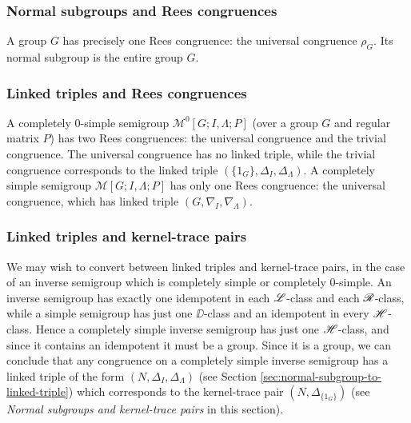 \subsubsection{Normal subgroups and Rees congruences}
A group $G$ has precisely one Rees congruence: the universal congruence
$\rho_G$.  Its normal subgroup is the entire group $G$.

\subsubsection{Linked triples and Rees congruences}
A completely 0-simple semigroup $\mathcal{M}^0[G;I,\Lambda;P]$ (over a group $G$
and regular matrix $P$) has two Rees
congruences: the universal congruence and the trivial congruence.  The universal
congruence has no linked triple, while the trivial congruence corresponds to the
linked triple $(\{1_G\}, \Delta_I, \Delta_\Lambda)$.  A completely simple
semigroup $\mathcal{M}[G;I,\Lambda;P]$ has only one Rees congruence: the
universal congruence, which has linked triple $(G, \nabla_I, \nabla_\Lambda)$.

\subsubsection{Linked triples and kernel-trace pairs}
We may wish to convert between linked triples and kernel-trace pairs, in the
case of an inverse semigroup which is completely simple or completely 0-simple.
An inverse semigroup has exactly one idempotent in each $\mathrel{\mathscr{L}}$-class and each
$\mathrel{\mathscr{R}}$-class, while a simple semigroup has just one $\DD$-class and an idempotent
in every $\mathrel{\mathscr{H}}$-class.  Hence a completely simple inverse semigroup has just one
$\mathrel{\mathscr{H}}$-class, and since it contains an idempotent it must be a group.  Since it
is a group, we can conclude that any congruence on a completely simple inverse
semigroup has a linked triple of the form $(N, \Delta_I, \Delta_\Lambda)$ (see
Section \ref{sec:normal-subgroup-to-linked-triple}) which corresponds to the
kernel-trace pair $(N, \Delta_{\{1_G\}})$ (see \textit{Normal subgroups and
  kernel-trace pairs} in this section).


